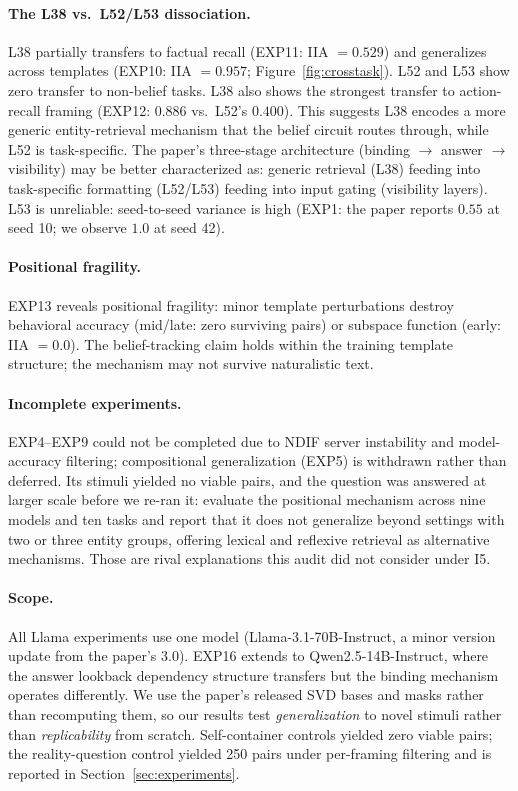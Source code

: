 \documentclass{article}
\begin{document}
\paragraph{The L38 vs.\ L52/L53 dissociation.}
L38 partially transfers to factual recall (EXP11: IIA $= 0.529$) and generalizes across templates (EXP10: IIA $= 0.957$; Figure~\ref{fig:crosstask}). L52 and L53 show zero transfer to non-belief tasks. L38 also shows the strongest transfer to action-recall framing (EXP12: $0.886$ vs.\ L52's $0.400$). This suggests L38 encodes a more generic entity-retrieval mechanism that the belief circuit routes through, while L52 is task-specific. The paper's three-stage architecture (binding $\to$ answer $\to$ visibility) may be better characterized as: generic retrieval (L38) feeding into task-specific formatting (L52/L53) feeding into input gating (visibility layers). L53 is unreliable: seed-to-seed variance is high (EXP1: the paper reports $0.55$ at seed 10; we observe $1.0$ at seed 42).

\paragraph{Positional fragility.}
EXP13 reveals positional fragility: minor template perturbations destroy behavioral accuracy (mid/late: zero surviving pairs) or subspace function (early: IIA $= 0.0$). The belief-tracking claim holds within the training template structure; the mechanism may not survive naturalistic text.

\paragraph{Incomplete experiments.}
EXP4--EXP9 could not be completed due to NDIF server instability and model-accuracy filtering; compositional generalization (EXP5) is withdrawn rather than deferred. Its stimuli yielded no viable pairs, and the question was answered at larger scale before we re-ran it: \citet{gurarieh2025mixing} evaluate the positional mechanism across nine models and ten tasks and report that it does not generalize beyond settings with two or three entity groups, offering lexical and reflexive retrieval as alternative mechanisms. Those are rival explanations this audit did not consider under I5.

\paragraph{Scope.}
All Llama experiments use one model (Llama-3.1-70B-Instruct, a minor version update from the paper's 3.0). EXP16 extends to Qwen2.5-14B-Instruct, where the answer lookback dependency structure transfers but the binding mechanism operates differently. We use the paper's released SVD bases and masks rather than recomputing them, so our results test \emph{generalization} to novel stimuli rather than \emph{replicability} from scratch. Self-container controls yielded zero viable pairs; the reality-question control yielded 250 pairs under per-framing filtering and is reported in Section~\ref{sec:experiments}.
\end{document}
